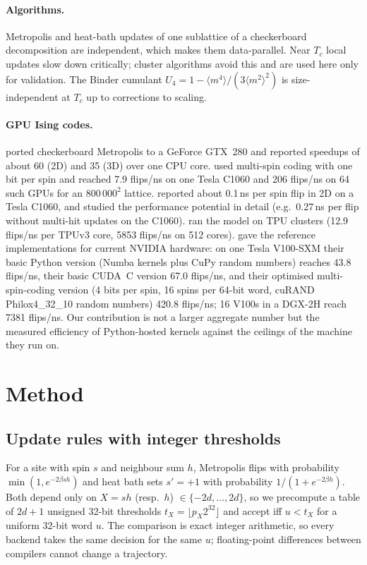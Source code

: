\documentclass[11pt]{article}
\begin{document}
\paragraph{Algorithms.} Metropolis \citep{Metropolis1953} and heat-bath updates of one
sublattice of a checkerboard decomposition are independent, which makes them data-parallel.
Near $T_c$ local updates slow down critically; cluster algorithms
\citep{SwendsenWang1987,Wolff1989} avoid this and are used here only for validation. The
Binder cumulant $U_4=1-\langle m^4\rangle/(3\langle m^2\rangle^2)$ \citep{Binder1981} is
size-independent at $T_c$ up to corrections to scaling.

\paragraph{GPU Ising codes.} \citet{Preis2009} ported checkerboard Metropolis to a GeForce
GTX~280 and reported speedups of about 60 (2D) and 35 (3D) over one CPU core.
\citet{Block2010} used multi-spin coding with one bit per spin and reached 7.9 flips/ns on one
Tesla C1060 and 206 flips/ns on 64 such GPUs for an $800\,000^2$ lattice. \citet{Weigel2011}
reported about 0.1\,ns per spin flip in 2D on a Tesla C1060, and \citet{Weigel2012} studied the
performance potential in detail (e.g.\ 0.27\,ns per flip without multi-hit updates on the
C1060). \citet{Yang2019TPU} ran the model on TPU clusters (12.9 flips/ns per TPUv3 core,
5853 flips/ns on 512 cores). \citet{Romero2020} gave the reference implementations for current
NVIDIA hardware: on one Tesla V100-SXM their basic Python version (Numba kernels plus CuPy
random numbers) reaches 43.8 flips/ns, their basic CUDA~C version 67.0 flips/ns, and their
optimised multi-spin-coding version (4 bits per spin, 16 spins per 64-bit word, cuRAND
Philox4\_32\_10 random numbers) 420.8 flips/ns; 16 V100s in a DGX-2H reach 7381 flips/ns. Our
contribution is not a larger aggregate number but the measured efficiency of Python-hosted
kernels against the ceilings of the machine they run on.

\section{Method}

\subsection{Update rules with integer thresholds}
For a site with spin $s$ and neighbour sum $h$, Metropolis flips with probability
$\min(1,e^{-2\beta sh})$ and heat bath sets $s'=+1$ with probability $1/(1+e^{-2\beta h})$.
Both depend only on $X=sh$ (resp.\ $h$) $\in\{-2d,\dots,2d\}$, so we precompute a table of
$2d+1$ unsigned 32-bit thresholds $t_X=\lfloor p_X2^{32}\rfloor$ and accept iff $u<t_X$ for a
uniform 32-bit word $u$. The comparison is exact integer arithmetic, so every backend takes the
same decision for the same $u$; floating-point differences between compilers cannot change a
trajectory.
\end{document}
